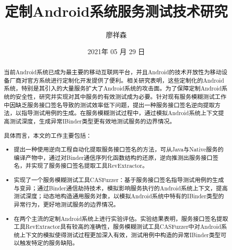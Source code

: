 \documentclass[winfonts,master,twoside]{njuthesis}
\title{定制Android系统服务测试技术研究}
\author{廖祥森}
\institute{南京大学}
\date{2021年 05 月 29 日}
\begin{document}

\maketitle
\makeenglishtitle


\frontmatter

\begin{abstract}

当前Android系统已成为最主要的移动互联网平台，并且Android的技术开放性为移动设备厂商对官方系统进行定制化开发提供了便利。相关研究表明，这些定制化的Android系统，特别是其引入的大量服务扩大了Android系统的攻击面。为了保障定制Android系统的安全性，研究并实现对其中服务的有效测试成为必要。针对现有服务模糊测试工作中因缺乏服务接口签名导致的测试效率低下问题，提出一种服务接口签名逆向提取方法，以指导测试用例的生成。在服务模糊测试过程中，通过模拟Android系统上下文提高测试深度，生成异常IBinder类型更有效地测试服务的边界情况。

具体而言，本文的工作主要包括：

\begin{itemize}
	\item 提出一种使用逆向工程自动化提取服务接口签名的方法，可从Java与Native服务的编译产物中，通过对Binder通信序列化函数结构的还原，逆向推测出服务接口签名，并实现了服务接口签名提取工具RevExtractor。
	\item 实现了一个服务模糊测试工具CASFuzzer：基于服务接口签名指导测试用例的生成与变异；通过Binder通信劫持技术，模拟影响服务执行的Android系统上下文，提高测试深度；动态地构造通用服务对象，以模拟Android系统中特有的IBinder类型的异常行为，更好地测试服务的边界情况。
	\item 在两个主流的定制Android系统上进行实验评估。实验结果表明，服务接口签名提取工具RevExtractor具有较高的准确性，服务模糊测试工具CASFuzzer中对Android系统上下文的模拟使得测试过程更加深入有效，测试用例中构造的异常IBinder类型可以触发特定的服务缺陷。
\end{itemize}

\end{abstract}
\end{document}
